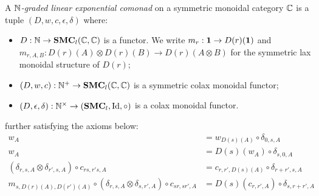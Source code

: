 
\begin{definition}
A \emph{$\mathbb{N}$-graded linear exponential comonad} on a symmetric monoidal category $\mathbb{C}$ is a tuple
$(D, w,c,\epsilon,\delta)$ where:
\begin{itemize}

\item $D: \mathbb{N}\to \mathbf{SMC}_{l}(\mathbb{C}, \mathbb{C})$ is a functor. We write 
$m_{r}:\mathbf{1} \to D(r)(\mathbf{1})$ and $m_{r,A,B}: D(r)(A)\otimes D(r)(B) \to D(r)(A\otimes B)$ for the symmetric lax monoidal structure of $D(r)$;

\item $(D,w,c): \mathbb{N}^{+}\to \mathbf{SMC}_{l}(\mathbb{C}, \mathbb{C})$ is a symmetric colax monoidal functor;

\item $(D,\epsilon,\delta):\mathbb{N}^{\times}\to (\mathbf{SMC}_{l},\mathrm{Id},\circ) $ is a colax monoidal functor.



\end{itemize}
further satisfying the axioms below:
\begin{align}
w_{A}& =  w_{D(s)(A)}\circ \delta_{0,s,A}\\
w_{A} & = D(s)(w_{A} )\circ \delta_{s,0,A} \\
(\delta_{r,s,A}\otimes \delta_{r',s,A})\circ c_{rs,r's,A}
&=
c_{r,r',D(s)(A)}\circ \delta_{r+r',s,A}\\
m_{s,D(r)(A),D(r')(A)}\circ (\delta_{r,s,A}\otimes \delta_{s,r',A})\circ c_{sr,sr',A}&=
D(s)(c_{r,r',A})\circ \delta_{s,r+r',A}
\end{align}
\end{definition}


